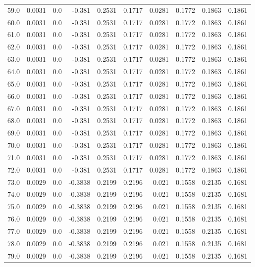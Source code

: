 \begin{longtable}{lrrrrrrrrr}
59.0 & 0.0031 & 0.0 & -0.381 & 0.2531 & 0.1717 & 0.0281 & 0.1772 & 0.1863 & 0.1861 \\
60.0 & 0.0031 & 0.0 & -0.381 & 0.2531 & 0.1717 & 0.0281 & 0.1772 & 0.1863 & 0.1861 \\
61.0 & 0.0031 & 0.0 & -0.381 & 0.2531 & 0.1717 & 0.0281 & 0.1772 & 0.1863 & 0.1861 \\
62.0 & 0.0031 & 0.0 & -0.381 & 0.2531 & 0.1717 & 0.0281 & 0.1772 & 0.1863 & 0.1861 \\
63.0 & 0.0031 & 0.0 & -0.381 & 0.2531 & 0.1717 & 0.0281 & 0.1772 & 0.1863 & 0.1861 \\
64.0 & 0.0031 & 0.0 & -0.381 & 0.2531 & 0.1717 & 0.0281 & 0.1772 & 0.1863 & 0.1861 \\
65.0 & 0.0031 & 0.0 & -0.381 & 0.2531 & 0.1717 & 0.0281 & 0.1772 & 0.1863 & 0.1861 \\
66.0 & 0.0031 & 0.0 & -0.381 & 0.2531 & 0.1717 & 0.0281 & 0.1772 & 0.1863 & 0.1861 \\
67.0 & 0.0031 & 0.0 & -0.381 & 0.2531 & 0.1717 & 0.0281 & 0.1772 & 0.1863 & 0.1861 \\
68.0 & 0.0031 & 0.0 & -0.381 & 0.2531 & 0.1717 & 0.0281 & 0.1772 & 0.1863 & 0.1861 \\
69.0 & 0.0031 & 0.0 & -0.381 & 0.2531 & 0.1717 & 0.0281 & 0.1772 & 0.1863 & 0.1861 \\
70.0 & 0.0031 & 0.0 & -0.381 & 0.2531 & 0.1717 & 0.0281 & 0.1772 & 0.1863 & 0.1861 \\
71.0 & 0.0031 & 0.0 & -0.381 & 0.2531 & 0.1717 & 0.0281 & 0.1772 & 0.1863 & 0.1861 \\
72.0 & 0.0031 & 0.0 & -0.381 & 0.2531 & 0.1717 & 0.0281 & 0.1772 & 0.1863 & 0.1861 \\
73.0 & 0.0029 & 0.0 & -0.3838 & 0.2199 & 0.2196 & 0.021 & 0.1558 & 0.2135 & 0.1681 \\
74.0 & 0.0029 & 0.0 & -0.3838 & 0.2199 & 0.2196 & 0.021 & 0.1558 & 0.2135 & 0.1681 \\
75.0 & 0.0029 & 0.0 & -0.3838 & 0.2199 & 0.2196 & 0.021 & 0.1558 & 0.2135 & 0.1681 \\
76.0 & 0.0029 & 0.0 & -0.3838 & 0.2199 & 0.2196 & 0.021 & 0.1558 & 0.2135 & 0.1681 \\
77.0 & 0.0029 & 0.0 & -0.3838 & 0.2199 & 0.2196 & 0.021 & 0.1558 & 0.2135 & 0.1681 \\
78.0 & 0.0029 & 0.0 & -0.3838 & 0.2199 & 0.2196 & 0.021 & 0.1558 & 0.2135 & 0.1681 \\
79.0 & 0.0029 & 0.0 & -0.3838 & 0.2199 & 0.2196 & 0.021 & 0.1558 & 0.2135 & 0.1681 \\

\end{longtable}
